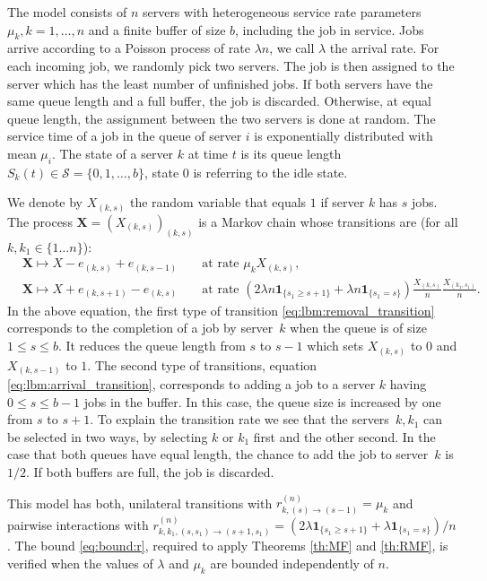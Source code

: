 \documentclass[acmsmall]{acmart}
\newcommand\bX{\mathbf{X}}
\newcommand\calS{\mathcal{S}}
\newcommand\toN{^{(n)}}
\begin{document}
\color{myorange}
The model consists of $n$ servers with heterogeneous service rate parameters $\mu_k, k=1,\ldots,n$ and a finite buffer of size $b$, including the job in service. Jobs arrive according to a Poisson process of rate $\lambda n$, we call $\lambda$ the arrival rate. For each incoming job, we randomly pick two servers. The job is then assigned to the server which has the least number of unfinished jobs. If both servers have the same queue length and a full buffer, the job is discarded. Otherwise, at equal queue length, the assignment between the two servers is done at random. The service time of a job in the queue of server $i$ is exponentially distributed with mean $\mu_i$. The state of a server $k$ at time $t$ is its queue length $S_k(t) \in \calS= \{0,1,\ldots, b\}$, state $0$ is referring to the idle state. 

We denote by $X_{(k,s)}$ the random variable that equals $1$ if server $k$ has $s$ jobs. The process $\bX=(X_{(k,s)})_{(k,s)}$ is a Markov chain whose transitions are (for all $k,k_1\in\{1\dots n\}$):
\begin{subequations}
  \begin{align}
    &\bX \mapsto X - e_{(k,s)} + e_{(k,s-1)} && \text{ at rate } \mu_k X_{(k,s)}, \label{eq:lbm:removal_transition}\\
    &\bX \mapsto X + e_{(k,s+1)} - e_{(k,s)} && \text{ at rate } (2\lambda n \mathbf{1}_{\{s_1 \geq s+1\}} +  \lambda n \mathbf{1}_{\{s_1 = s\}}) \frac{X_{(k,s)}}{n} \frac{X_{(k_1,s_1)}}{n}. \label{eq:lbm:arrival_transition}
  \end{align}
\end{subequations}
In the above equation, the first type of transition \eqref{eq:lbm:removal_transition} corresponds to the completion of a job by server~$k$ when the queue is of size $1 \leq s \leq b$. It reduces the queue length from $s$ to $s-1$ which sets $X_{(k,s)}$ to $0$ and $X_{(k,s-1)}$ to $1$. The second type of transitions, equation \eqref{eq:lbm:arrival_transition}, corresponds to adding a job to a server $k$ having $0 \leq s \leq b-1$ jobs in the buffer. In this case, the queue size is increased by one from $s$ to $s+1$. To explain the transition rate we see that the servers~$k, k_1$ can be selected in two ways, by selecting $k$ or $k_1$ first and the other second. In the case that both queues have equal length, the chance to add the job to server~$k$ is $1/2$. If both buffers are full, the job is discarded. 

This model has both, unilateral transitions with $r_{k,(s) \rightarrow (s-1)}\toN = \mu_k$ and pairwise interactions with $r_{k,k_1,(s,s_1)\rightarrow (s+1,s_1)}\toN = (2\lambda \mathbf{1}_{\{s_1 \geq s+1\}} +  \lambda \mathbf{1}_{\{s_1 = s\}})/n$. The bound \eqref{eq:bound:r}, required to apply Theorems \ref{th:MF} and \ref{th:RMF}, is verified when the values of $\lambda$ and $\mu_k$ are bounded independently of $n$. \color{black}
\end{document}
